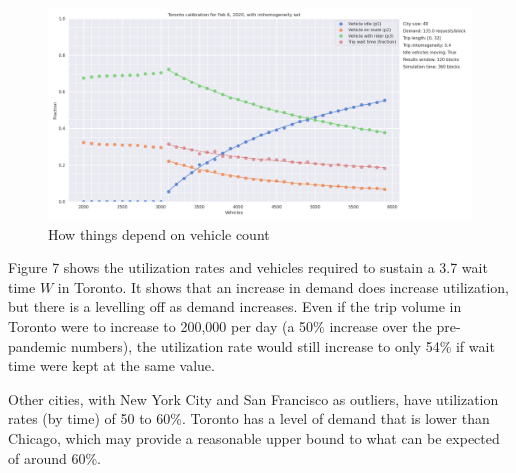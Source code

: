\documentclass[
  letterpaper,
]{article}
\begin{document}
\begin{figure}

{\centering \includegraphics{toronto_vehicle_count.png}

}

\caption{How things depend on vehicle count}

\end{figure}

Figure 7 shows the utilization rates and vehicles required to sustain a
3.7 wait time \(W\) in Toronto. It shows that an increase in demand does
increase utilization, but there is a levelling off as demand increases.
Even if the trip volume in Toronto were to increase to 200,000 per day
(a 50\% increase over the pre-pandemic numbers), the utilization rate
would still increase to only 54\% if wait time were kept at the same
value.

Other cities, with New York City and San Francisco as outliers, have
utilization rates (by time) of 50 to 60\%. Toronto has a level of demand
that is lower than Chicago, which may provide a reasonable upper bound
to what can be expected of around 60\%.
\end{document}

